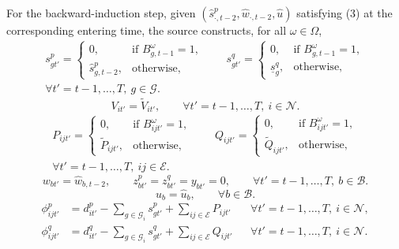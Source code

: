 \documentclass[10pt]{article}
\begin{document}
For the backward-induction step, given $(\hat s_{\cdot,t-2}^p,\hat w_{\cdot,t-2},\hat u)$ satisfying (3) at the corresponding entering time, the source constructs, for all $\omega\in\Omega$,
\begin{equation}
\begin{gathered}
s_{gt'}^p=\begin{cases}0,&\text{if }B_{g,t-1}^\omega=1,\\\hat s_{g,t-2}^p,&\text{otherwise},\end{cases}
\qquad s_{gt'}^q=\begin{cases}0,&\text{if }B_{g,t-1}^\omega=1,\\\underline s_g^q,&\text{otherwise},\end{cases}\\
\forall t'=t-1,\ldots,T,\ g\in\mathcal G.
\end{gathered}\tag{5a}
\end{equation}
\begin{equation}
V_{it'}=\widetilde V_{it'},\qquad\forall t'=t-1,\ldots,T,\ i\in\mathcal N.\tag{5b}
\end{equation}
\begin{equation}
\begin{gathered}
P_{ijt'}=\begin{cases}0,&\text{if }B_{ijt'}^\omega=1,\\\widetilde P_{ijt'},&\text{otherwise},\end{cases}
\qquad Q_{ijt'}=\begin{cases}0,&\text{if }B_{ijt'}^\omega=1,\\\widetilde Q_{ijt'},&\text{otherwise},\end{cases}\\
\forall t'=t-1,\ldots,T,\ ij\in\mathcal E.
\end{gathered}\tag{5c}
\end{equation}
\begin{equation}
w_{bt'}=\hat w_{b,t-2},\qquad z_{bt'}^p=z_{bt'}^q=y_{bt'}=0,\qquad\forall t'=t-1,\ldots,T,\ b\in\mathcal B.\tag{5d}
\end{equation}
\begin{equation}
u_b=\hat u_b,\qquad\forall b\in\mathcal B.\tag{5e}
\end{equation}
\begin{align}
\phi_{ijt'}^p&=d_{it'}^p-\sum_{g\in\mathcal G_i}s_{gt'}^p+\sum_{ij\in\mathcal E}P_{ijt'}
&&\forall t'=t-1,\ldots,T,\ i\in\mathcal N,\tag{5f}\\
\phi_{ijt'}^q&=d_{it'}^q-\sum_{g\in\mathcal G_i}s_{gt'}^q+\sum_{ij\in\mathcal E}Q_{ijt'}
&&\forall t'=t-1,\ldots,T,\ i\in\mathcal N.\tag{5g}
\end{align}
\end{document}
